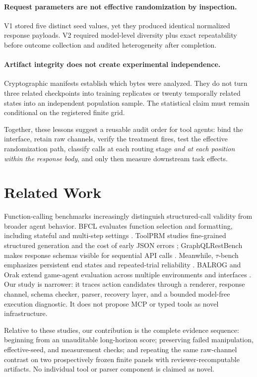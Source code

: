 \documentclass[10pt]{article}
\begin{document}
\paragraph{Request parameters are not effective randomization by inspection.}
V1 stored five distinct seed values, yet they produced identical normalized
response payloads. V2 required model-level diversity plus exact repeatability before
outcome collection and audited heterogeneity after completion.

\paragraph{Artifact integrity does not create experimental independence.}
Cryptographic manifests establish which bytes were analyzed. They do not turn
three related checkpoints into training replicates or twenty temporally related
states into an independent population sample. The statistical claim must remain
conditional on the registered finite grid.

Together, these lessons suggest a reusable audit order for tool agents: bind the
interface, retain raw channels, verify the treatment fires, test the effective
randomization path, classify calls at each routing stage \emph{and at each
position within the response body}, and only then measure downstream task
effects.

\section{Related Work}

Function-calling benchmarks increasingly distinguish structured-call validity
from broader agent behavior. BFCL evaluates function selection and formatting,
including stateful and multi-step settings \citep{patil2025bfcl}. ToolPRM
studies fine-grained structured generation and the cost of early JSON errors
\citep{lin2026toolprm}; GraphQLRestBench makes response schemas visible for
sequential API calls \citep{saha2024graphql}. Meanwhile, $\tau$-bench
emphasizes persistent end states and repeated-trial reliability
\citep{yao2025taubench}. BALROG and Orak extend game-agent evaluation across
multiple environments and interfaces \citep{paglieri2025balrog,park2025orak}.
Our study is narrower: it traces action candidates through a renderer, response
channel, schema checker, parser, recovery layer, and a bounded model-free
execution diagnostic. It does not propose MCP or typed tools as novel
infrastructure.

Relative to these studies, our contribution is the complete evidence sequence:
beginning from an unauditable long-horizon score; preserving failed
manipulation, effective-seed, and measurement checks; and repeating the same
raw-channel contrast on two prospectively frozen finite panels with
reviewer-recomputable artifacts. No individual tool or parser component is
claimed as novel.
\end{document}
